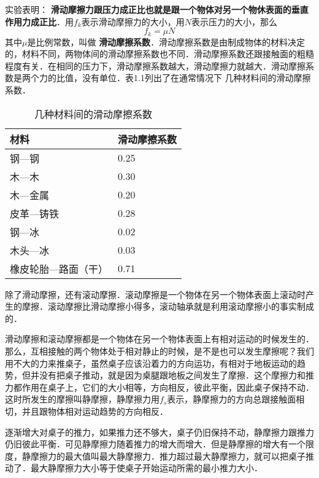 实验表明：\textbf{ 滑动摩擦力跟压力成正比也就是跟一个物体对另一个物休表面的垂直作用力成正比}．用$f_k$表示滑动摩擦力的大小，用$N$表示压力的大小，那么
\begin{equation}
    f_k=\mu N
\end{equation}
其中$\mu$是比例常数，叫做\textbf{ 滑动摩擦系数}．滑动摩擦系数是由制成物体的材料决定的，材料不同，两物体间的滑动摩擦系数也不同．滑动摩擦系数还跟接触面的粗糙程度有关．在相同的压力下，滑动摩擦系数越大，滑动摩擦力就越大．滑动摩擦系数是两个力的比值，没有单位．表1.1列出了在通常情况下
几种材料间的滑动摩擦系数．

\begin{table}[H]
    \centering
    \caption{几种材料间的滑动摩擦系数}
    \begin{tabularx}{\textwidth}{MM}
        \toprule[1.5pt]
        材料         & 滑动摩擦系数 \\
        \midrule
        钢—钢        & 0.25   \\
        木—木        & 0.30   \\
        木—金属       & 0.20   \\
        皮革—铸铁      & 0.28   \\
        钢—冰        & 0.02   \\
        木头—冰       & 0.03   \\
        橡皮轮胎—路面（干） & 0.71   \\
        \bottomrule[1.5pt]
    \end{tabularx}
\end{table}

除了滑动摩擦，还有滚动摩擦．滚动摩擦是一个物体在另一个物体表面上滚动时产生的摩擦．滚动摩擦比滑动摩擦小得多，滚动轴承就是利用滚动摩擦小的事实制成的．

滑动摩擦和滚动摩擦都是一个物体在另一个物体表面上有相对运动的时候发生的．那么，互相接触的两个物体处于相对静止的时候，是不是也可以发生摩擦呢？我们用不大的力来推桌子，虽然桌子应该沿着力的方向运功，有相对于地板运动的趋势，但并没有把桌子推动，就是因为桌腿跟地板之间发生了摩擦．这个摩擦力和推力都作用在桌子上，它们的大小相等，方向相反，彼此平衡，因此桌子保持不动．这时所发生的摩擦叫静摩擦，静摩擦力用$f_s$表示，静摩擦力的方向总跟接触面相切，并且跟物体相对运动趋势的方向相反．

逐渐增大对桌子的推力，如果推力还不够大，桌子仍旧保持不动，静摩擦力跟推力仍旧彼此平衡．可见静摩擦力随着推力的增大而增大．但是静摩擦的增大有一个限度，静摩擦力的最大值叫最大静摩擦力．推力超过最大静摩擦力，就可以把桌子推动了．最大静摩擦力大小等于使桌子开始运动所需的最小推力大小．

